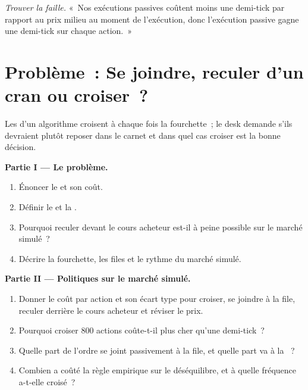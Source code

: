 \begin{exercise}[$\star\star\star$]\label{exo:mx:child-order-placement:8}
\emph{Trouver la faille.} «~Nos exécutions passives coûtent moins une demi-tick par rapport au prix milieu au moment de l'exécution, donc l'exécution passive gagne une demi-tick sur chaque action.~»
\end{exercise}

\section{Problème~: Se joindre, reculer d'un cran ou croiser~?}

\begin{problem}\label{pb:mx:child-order-placement:1}
Les  d'un algorithme croisent à chaque fois la fourchette~; le desk demande s'ils devraient plutôt reposer dans le carnet et dans quel cas croiser est la bonne décision.

\medskip\noindent\textbf{Partie I --- Le problème.}
\begin{enumerate}
\item Énoncer le  et son coût.
\item Définir le  et la .
\item Pourquoi reculer devant le cours acheteur est-il à peine possible sur le marché simulé~?
\item Décrire la fourchette, les files et le rythme du marché simulé.
\end{enumerate}

\medskip\noindent\textbf{Partie II --- Politiques sur le marché simulé.}
\begin{enumerate}[resume]
\item Donner le coût par action et son écart type pour croiser, se joindre à la file, reculer derrière le cours acheteur et réviser le prix.
\item Pourquoi croiser 800 actions coûte-t-il plus cher qu'une demi-tick~?
\item Quelle part de l'ordre se joint passivement à la file, et quelle part va à la ~?
\item Combien a coûté la règle empirique sur le déséquilibre, et à quelle fréquence a-t-elle croisé~?
\end{enumerate}


\end{problem}
